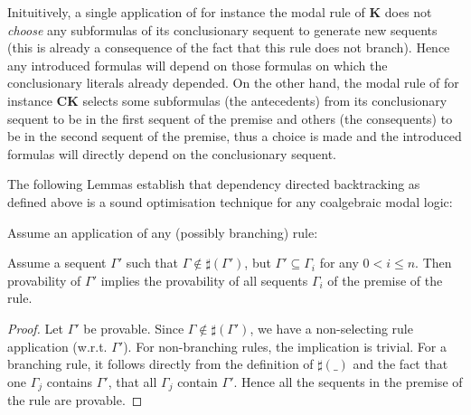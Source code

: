 \documentclass{llncs}
\begin{document}
Inituitively, a single application of for instance the modal rule of \textbf{K} 
does not \emph{choose} any subformulas of its conclusionary sequent to generate new sequents
(this is already a consequence of the fact that this rule does not branch).
Hence any introduced formulas will depend on those formulas on which the conclusionary literals
already depended.
On the other hand, the modal rule of for instance \textbf{CK} selects some subformulas (the antecedents)
from its conclusionary sequent to be in the first sequent of the premise and others
(the consequents) to be in the second sequent of the premise, thus a choice is made and the
introduced formulas will directly depend on the conclusionary sequent.

The following Lemmas establish that dependency directed backtracking as defined above
is a sound optimisation technique for any coalgebraic modal logic:

\begin{lemma}
Assume an application of any (possibly branching) rule:
\begin{quote}
\centerline{}
\end{quote}
Assume a sequent $\Gamma'$ such that $\Gamma\notin\sharp(\Gamma')$,
but $\Gamma'\subseteq \Gamma_i$ for any $0<i\leq n$.
Then provability of $\Gamma'$ implies the provability of all sequents $\Gamma_i$ of
the premise of the rule.
\begin{proof} Let $\Gamma'$ be provable. Since $\Gamma\notin\sharp(\Gamma')$, we have a non-selecting
rule application (w.r.t. $\Gamma'$). For non-branching rules, the implication is trivial. For a
branching rule, it follows directly from the definition of $\sharp(\_)$ and the fact that one
$\Gamma_j$ contains $\Gamma'$, that all $\Gamma_j$ contain $\Gamma'$.
Hence all the sequents in the premise of the rule are provable.
\end{proof}
\label{lemma:provabilityPropagates}
\end{lemma}

\end{document}
